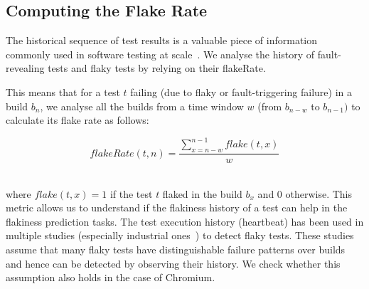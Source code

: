 \begin{table}[ht]
\centering
\caption{Data collected from the Chromium CI. We used the \textit{Linux Tests} tester, with \textit{10,000} Builds mined over \textit{nine} months. We extracted Passing, Flaky and Fault-revealing tests and their associated Flaky and Fault-triggering Failures.}
\label{table:infoDataset}
\end{table}

\subsection{Computing the Flake Rate}
\label{sec:testHistory}

The historical sequence of test results is a valuable piece of information commonly used in software testing at scale~\cite{LeongSPTM19,Kowalczyk2020}. We analyse the history of fault-revealing tests and flaky tests by relying on their \textsf{flakeRate}.

This means that for a test $t$ failing (due to flaky or fault-triggering failure) in a build $b_{n}$, we analyse all the builds from a time window $w$ (\ie from $b_{n-w}$ to $b_{n-1})$ to calculate its flake rate as follows: \\

\noindent\begin{minipage}{\linewidth}
\begin{equation}
  flakeRate(t,n) = \frac{ \sum_{x=n-w}^{n-1} flake(t,x) } {w}
\end{equation}
\end{minipage}%
\\

where $flake(t,x) = 1$ if the test $t$ flaked in the build $b_{x}$ and 0 otherwise.
This metric allows us to understand if the flakiness history of a test can help in the flakiness prediction tasks.
The test execution history (\aka heartbeat) has been used in multiple studies (especially industrial ones~\cite{Kowalczyk2020,LeongSPTM19}) to detect flaky tests.
These studies assume that many flaky tests have distinguishable failure patterns over builds and hence can be detected by observing their history.
We check whether this assumption also holds in the case of Chromium.

